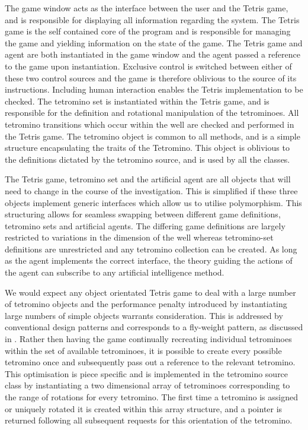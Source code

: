 \documentclass{rucsthesis}
\begin{document}
The game window acts as the interface between the user and the Tetris game, and is responsible for displaying all information regarding the system. The Tetris game is the self contained core of the program and is responsible for managing the game and yielding information on the state of the game. The Tetris game and agent are both instantiated in the game window and the agent passed a reference to the game upon instantiation. Exclusive control is switched between either of these two control sources and the game is therefore oblivious to the source of its instructions.  Including human interaction enables the Tetris implementation to be checked. The tetromino set is instantiated within the Tetris game, and is responsible for the definition and rotational manipulation of the tetrominoes. All tetromino transitions which occur within the well are checked and performed in the Tetris game. The tetromino object is common to all methods, and is a simple structure encapsulating the traits of the Tetromino. This object is oblivious to the definitions dictated by the tetromino source, and is used by all the classes.

The Tetris game, tetromino set and the artificial agent are all objects that will need to change in the course of the investigation. This is simplified if these three objects implement generic interfaces which allow us to utilise polymorphism. This structuring allows for seamless swapping between different game definitions, tetromino sets and artificial agents. The differing game definitions are largely restricted to variations in the dimension of the well whereas tetromino-set definitions are unrestricted and any tetromino collection can be created. As long as the agent implements the correct interface, the theory guiding the actions of the agent can subscribe to any artificial intelligence method.

We would expect any object orientated Tetris game to deal with a large number of tetromino objects and the performance penalty introduced by instantiating large numbers of simple objects warrants consideration. This is addressed by conventional design patterns and corresponds to a fly-weight pattern, as discussed in \cite{designp}. Rather then having the game continually recreating individual tetrominoes within the set of available tetrominoes, it is possible to create every possible tetromino once and subsequently pass out a reference to the relevant tetromino. This optimisation is piece specific and is implemented in the tetromino source class by instantiating a two dimensional array of tetrominoes corresponding to the range of rotations for every tetromino. The first time a tetromino is assigned or uniquely rotated it is created within this array structure, and a pointer is returned following all subsequent requests for this orientation of the tetromino.
\end{document}
